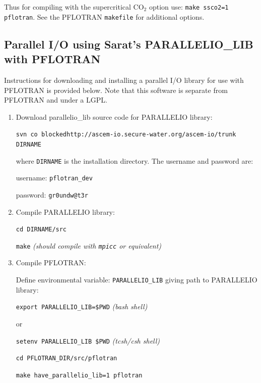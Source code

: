 \documentclass[12pt]{article}
\begin{document}
\noindent
Thus for compiling with the supercritical CO$_2$ option use: {\tt make ssco2=1 pflotran}.
See the PFLOTRAN \verb|makefile| for additional options.

\subsection{Parallel I/O using Sarat's PARALLELIO\_LIB with PFLOTRAN}

Instructions for downloading and installing a parallel I/O library for use with PFLOTRAN is provided below. Note that this software is separate from PFLOTRAN and under a LGPL.
\begin{enumerate}

\item Download parallelio\_lib source code for PARALLELIO library:

{\small\tt svn co blockedhttp://ascem-io.secure-water.org/ascem-io/trunk DIRNAME}

where {\tt DIRNAME} is the installation directory. The username and password are:

username: {\tt pflotran\_dev}

password: {\tt gr0undw@t3r}

\item Compile PARALLELIO library:

{\tt cd DIRNAME/src}

{\tt make} \hfill {\it (should compile with {\tt mpicc} or equivalent)}

\item Compile PFLOTRAN:

Define environmental variable: {\tt PARALLELIO\_LIB} giving path to PARALLELIO library:

{\tt export PARALLELIO\_LIB=\$PWD} \hfill {\it (bash shell)}

or

{\tt setenv PARALLELIO\_LIB \$PWD} \hfill {\it (tcsh/csh shell)}

{\tt cd PFLOTRAN\_DIR/src/pflotran}

{\tt make have\_parallelio\_lib=1 pflotran}

\end{enumerate}
\end{document}
